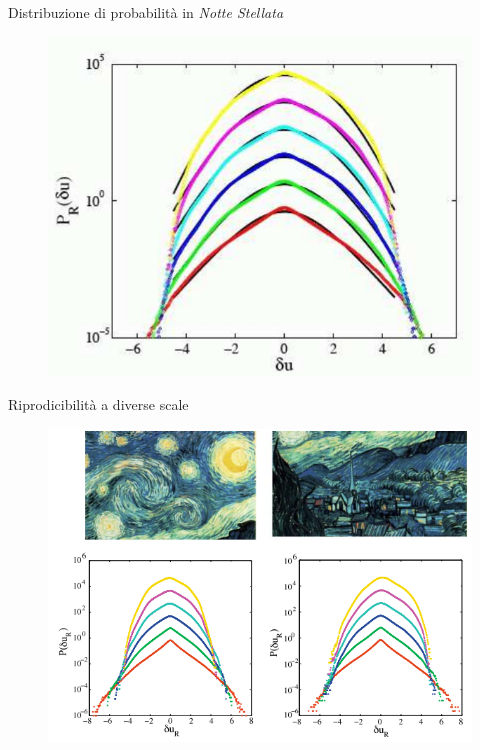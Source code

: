 \documentclass[11pt]{beamer}
\begin{document}
\begin{frame}{Distribuzione di probabilità in \emph{Notte Stellata}}
\begin{figure}
\centering
\includegraphics[scale=0.4]{gauss.png}
\end{figure}
\end{frame}

\begin{frame}{Riprodicibilità a diverse scale}
\begin{figure}
\centering
\includegraphics[scale=0.43]{studio3.png}
\end{figure}
\end{frame}
\end{document}
